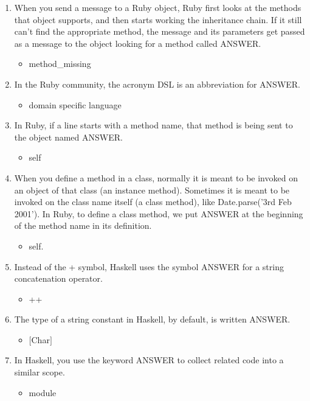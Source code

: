 \documentclass{exam}
\begin{document}
\begin{enumerate}
\begin{itemize}
\end{itemize}
\item When you send a message to a Ruby object, Ruby first looks at the methods that object supports, and then starts working the inheritance chain.  If it still can't find the appropriate method, the message and its parameters get passed as a message to the object looking for a method called ANSWER.
\begin{itemize}
\item method\_missing
\end{itemize}
\item In the Ruby community, the acronym DSL is an abbreviation for ANSWER.
\begin{itemize}
\item domain specific language
\end{itemize}
\item In Ruby, if a line starts with a method name, that method is being sent to the object named ANSWER.
\begin{itemize}
\item self
\end{itemize}
\item When you define a method in a class, normally it is meant to be invoked on an object of that class (an instance method).  Sometimes it is meant to be invoked on the class name itself (a class method), like Date.parse('3rd Feb 2001').  In Ruby, to define a class method, we put ANSWER at the beginning of the method name in its definition.
\begin{itemize}
\item self.
\end{itemize}
\item Instead of the +  symbol, Haskell uses the symbol ANSWER for a string concatenation operator.
\begin{itemize}
\item ++
\end{itemize}
\item The type of a string constant in Haskell, by default, is written ANSWER.
\begin{itemize}
\item $\lbrack$Char$\rbrack$
\end{itemize}
\item In Haskell, you use the keyword ANSWER to collect related code into a similar scope.
\begin{itemize}
\item module
\end{itemize}

\end{enumerate}
\end{document}
